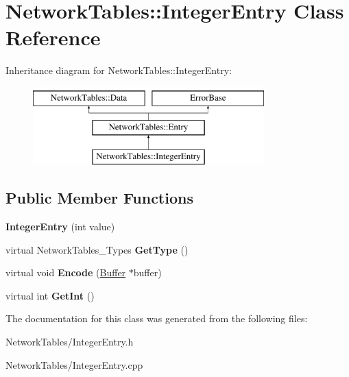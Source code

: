 \hypertarget{classNetworkTables_1_1IntegerEntry}{
\section{NetworkTables::IntegerEntry Class Reference}
\label{classNetworkTables_1_1IntegerEntry}
}
Inheritance diagram for NetworkTables::IntegerEntry:\begin{figure}[H]
\begin{center}
\leavevmode
\includegraphics[height=3.000000cm]{classNetworkTables_1_1IntegerEntry}
\end{center}
\end{figure}
\subsection*{Public Member Functions}
\begin{DoxyCompactItemize}
\item 
\hypertarget{classNetworkTables_1_1IntegerEntry_a8022c02e710d293328e8a2094faded30}{
{\bfseries IntegerEntry} (int value)}
\label{classNetworkTables_1_1IntegerEntry_a8022c02e710d293328e8a2094faded30}

\item 
\hypertarget{classNetworkTables_1_1IntegerEntry_af7b3c698e448117f6fb6c3233975b6f4}{
virtual NetworkTables\_\-Types {\bfseries GetType} ()}
\label{classNetworkTables_1_1IntegerEntry_af7b3c698e448117f6fb6c3233975b6f4}

\item 
\hypertarget{classNetworkTables_1_1IntegerEntry_a3a7a89ec20b76d3d8e8f0370928088eb}{
virtual void {\bfseries Encode} (\hyperlink{classNetworkTables_1_1Buffer}{Buffer} $\ast$buffer)}
\label{classNetworkTables_1_1IntegerEntry_a3a7a89ec20b76d3d8e8f0370928088eb}

\item 
\hypertarget{classNetworkTables_1_1IntegerEntry_a1996ef7c7aefc5ce5b22fbd71dbc17eb}{
virtual int {\bfseries GetInt} ()}
\label{classNetworkTables_1_1IntegerEntry_a1996ef7c7aefc5ce5b22fbd71dbc17eb}

\end{DoxyCompactItemize}


The documentation for this class was generated from the following files:\begin{DoxyCompactItemize}
\item 
NetworkTables/IntegerEntry.h\item 
NetworkTables/IntegerEntry.cpp\end{DoxyCompactItemize}
